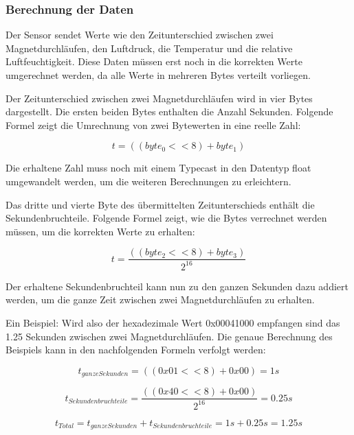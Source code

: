 \subsubsection{Berechnung der Daten}

Der Sensor sendet Werte wie den Zeitunterschied zwischen zwei Magnetdurchläufen, den Luftdruck, die Temperatur und die relative Luftfeuchtigkeit. Diese Daten müssen erst noch in die korrekten Werte umgerechnet werden, da alle Werte in mehreren Bytes verteilt vorliegen.

Der Zeitunterschied zwischen zwei Magnetdurchläufen wird in vier Bytes dargestellt. Die ersten beiden Bytes enthalten die Anzahl Sekunden. Folgende Formel zeigt die Umrechnung von zwei Bytewerten in eine reelle Zahl:

\begin{equation}
	t = ((byte_0 << 8) + byte_1)
\end{equation}

Die erhaltene Zahl muss noch mit einem Typecast in den Datentyp float umgewandelt werden, um die weiteren Berechnungen zu erleichtern.

Das dritte und vierte Byte des übermittelten Zeitunterschieds enthält die Sekundenbruchteile. Folgende Formel zeigt, wie die Bytes verrechnet werden müssen, um die korrekten Werte zu erhalten:

\begin{equation}
	t = \frac{((byte_2 << 8) + byte_3)}{2^{16}}
\end{equation}

Der erhaltene Sekundenbruchteil kann nun zu den ganzen Sekunden dazu addiert werden, um die ganze Zeit zwischen zwei Magnetdurchläufen zu erhalten.

Ein Beispiel: Wird also der hexadezimale Wert 0x00041000 empfangen sind das 1.25 Sekunden zwischen zwei Magnetdurchläufen. Die genaue Berechnung des Beispiels kann in den nachfolgenden Formeln verfolgt werden:

\begin{equation}
	t_{ganze Sekunden} = ((0x01 << 8) + 0x00) = 1 s
\end{equation}

\begin{equation}
	t_{Sekundenbruchteile} = \frac{((0x40 << 8) + 0x00)}{2^{16}} = 0.25 s
\end{equation}

\begin{equation}
	t_{Total} = t_{ganze Sekunden} + t_{Sekundenbruchteile} = 1 s + 0.25 s = 1.25 s
\end{equation}

